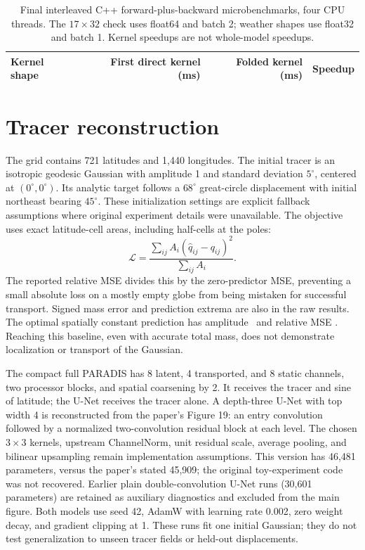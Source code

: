 \documentclass[10pt]{article}
\begin{document}
\begin{table}[ht]
\centering\small
\begin{tabular}{lrrr}
\toprule
Kernel shape & First direct kernel (ms) & Folded kernel (ms) & Speedup \\
\midrule

\bottomrule
\end{tabular}
\caption{Final interleaved C++ forward-plus-backward microbenchmarks, four CPU
threads. The $17\times32$ check uses float64 and batch 2; weather shapes use
float32 and batch 1. Kernel speedups are not whole-model speedups.}
\end{table}

\section{Tracer reconstruction}
The grid contains 721 latitudes and 1,440 longitudes. The initial tracer is an
isotropic geodesic Gaussian with amplitude 1 and standard deviation $5^\circ$,
centered at $(0^\circ,0^\circ)$. Its analytic target follows a $68^\circ$ great-circle
displacement with initial northeast bearing $45^\circ$. These initialization
settings are explicit fallback assumptions where original experiment details were
unavailable. The objective uses exact latitude-cell areas, including half-cells
at the poles:
\[
 \mathcal{L}=\frac{\sum_{ij} A_i(\hat q_{ij}-q_{ij})^2}{\sum_{ij} A_i}.
\]
The reported relative MSE divides this by the zero-predictor MSE, preventing a
small absolute loss on a mostly empty globe from being mistaken for successful
transport. Signed mass error and prediction extrema are also in the raw results.
The optimal spatially constant prediction has amplitude \ConstantAmplitude\ and
relative MSE \ConstantRatio. Reaching this baseline, even with accurate total
mass, does not demonstrate localization or transport of the Gaussian.

The compact full PARADIS has 8 latent, 4 transported, and 8 static channels, two
processor blocks, and spatial coarsening by 2. It receives the tracer and sine of
latitude; the U-Net receives the tracer alone. A depth-three U-Net with top width 4
is reconstructed from the paper's Figure 19: an entry convolution followed by a
normalized two-convolution residual block at each level. The chosen $3\times3$
kernels, upstream ChannelNorm, unit residual scale, average pooling, and bilinear
upsampling remain implementation assumptions. This version has 46,481 parameters,
versus the paper's stated 45,909; the original toy-experiment code was not recovered.
Earlier plain double-convolution U-Net runs (30,601 parameters) are retained as
auxiliary diagnostics and excluded from the main figure. Both models use seed 42, AdamW with learning rate 0.002,
zero weight decay, and gradient clipping at 1.
These runs fit one initial Gaussian; they do not test generalization to unseen
tracer fields or held-out displacements.
\end{document}
